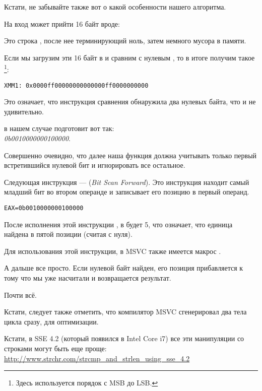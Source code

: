 Кстати, не забывайте также вот о какой особенности нашего алгоритма.

На вход может прийти 16 байт вроде:



Это строка , после нее терминирующий ноль, затем немного мусора в памяти.

Если мы загрузим эти 16 байт в  и сравним с нулевым , то в итоге получим такое 
\footnote{Здесь используется порядок с \ac{MSB} до \ac{LSB}.}:

\begin{verbatim}
XMM1: 0x0000ff00000000000000ff0000000000
\end{verbatim}

Это означает, что инструкция сравнения обнаружила два нулевых байта, что и не удивительно.

 в нашем случае подготовит \EAX вот так:\\
\emph{0b0010000000100000}.

Совершенно очевидно, что далее наша функция должна учитывать только первый встретившийся
нулевой бит и игнорировать все остальное.

\label{instruction_BSF}
Следующая инструкция ---  (\emph{Bit Scan Forward}). 
Это инструкция находит самый младший бит во втором операнде и записывает его позицию в первый операнд.

\begin{verbatim}
EAX=0b0010000000100000
\end{verbatim}

После исполнения этой инструкции , в \EAX будет 5, что означает, 
что единица найдена в пятой позиции (считая с нуля).

Для использования этой инструкции, в MSVC также имеется макрос .

А дальше все просто. Если нулевой байт найден, его позиция прибавляется к тому что 
мы уже насчитали и возвращается результат.

Почти всё.

Кстати, следует также отметить, что компилятор MSVC сгенерировал два тела цикла сразу, для оптимизации.

Кстати, в SSE 4.2 (который появился в Intel Core i7) все эти манипуляции со строками могут быть еще проще:
 \url{http://www.strchr.com/strcmp_and_strlen_using_sse_4.2}
